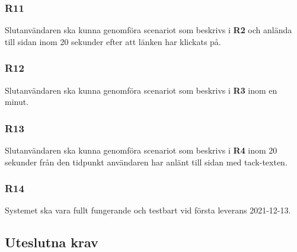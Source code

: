 \documentclass{article}
\begin{document}
    \subsubsection*{R11}
    Slutanvändaren ska kunna genomföra scenariot som beskrivs i \textbf{R2} och anlända till sidan inom 20 sekunder efter att länken har klickats på.
    
    \subsubsection*{R12}
    Slutanvändaren ska kunna genomföra scenariot som beskrivs i \textbf{R3} inom en minut.
    
    \subsubsection*{R13}
    Slutanvändaren ska kunna genomföra scenariot som beskrivs i \textbf{R4} inom 20 sekunder från den tidpunkt användaren har anlänt till sidan med tack-texten.
    
    \subsubsection*{R14}
    Systemet ska vara fullt fungerande och testbart vid första leverans 2021-12-13.
    
    
    \subsection*{Uteslutna krav}

\end{document}
